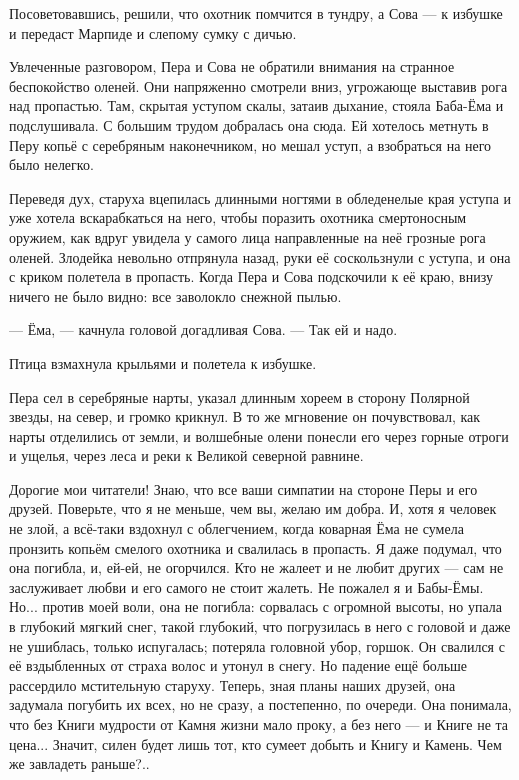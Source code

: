 \documentclass[12pt, a4paper, openany]{book}
\begin{document}
	Посоветовавшись, решили, что охотник помчится в тундру, а Сова — к избушке и передаст Марпиде и слепому сумку с дичью.
	
	Увлеченные разговором, Пера и Сова не обратили внимания на странное беспокойство оленей. Они напряженно смотрели вниз, угрожающе выставив рога над пропастью. Там, скрытая уступом скалы, затаив дыхание, стояла Баба-Ёма и подслушивала. С большим трудом добралась она сюда. Ей хотелось метнуть в Перу копьё с серебряным наконечником, но мешал уступ, а взобраться на него было нелегко.
	
	Переведя дух, старуха вцепилась длинными ногтями в обледенелые края уступа и уже хотела вскарабкаться на него, чтобы поразить охотника смертоносным оружием, как вдруг увидела у самого лица направленные на неё грозные рога оленей. Злодейка невольно отпрянула назад, руки её соскользнули с уступа, и она с криком полетела в пропасть. Когда Пера и Сова подскочили к её краю, внизу ничего не было видно: все заволокло снежной пылью.
	
	— Ёма, — качнула головой догадливая Сова. — Так ей и надо.
	
	Птица взмахнула крыльями и полетела к избушке.
	
	Пера сел в серебряные нарты, указал длинным хореем в сторону Полярной звезды, на север, и громко крикнул. В то же мгновение он почувствовал, как нарты отделились от земли, и волшебные олени понесли его через горные отроги и ущелья, через леса и реки к Великой северной равнине.
	
	Дорогие мои читатели! Знаю, что все ваши симпатии на стороне Перы и его друзей. Поверьте, что я не меньше, чем вы, желаю им добра. И, хотя я человек не злой, а всё-таки вздохнул с облегчением, когда коварная Ёма не сумела пронзить копьём смелого охотника и свалилась в пропасть. Я даже подумал, что она погибла, и, ей-ей, не огорчился. Кто не жалеет и не любит других — сам не заслуживает любви и его самого не стоит жалеть. Не пожалел я и Бабы-Ёмы. Но... против моей воли, она не погибла: сорвалась с огромной высоты, но упала в глубокий мягкий снег, такой глубокий, что погрузилась в него с головой и даже не ушиблась, только испугалась; потеряла головной убор, горшок. Он свалился с её вздыбленных от страха волос и утонул в снегу. Но падение ещё больше рассердило мстительную старуху. Теперь, зная планы наших друзей, она задумала погубить их всех, но не сразу, а постепенно, по очереди. Она понимала, что без Книги мудрости от Камня жизни мало проку, а без него — и Книге не та цена... Значит, силен будет лишь тот, кто сумеет добыть и Книгу и Камень. Чем же завладеть раньше?..
	
\end{document}
